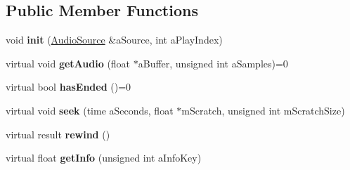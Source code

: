 \subsection*{Public Member Functions}
\begin{DoxyCompactItemize}
\item 
\mbox{\label{class_so_loud_1_1_audio_source_instance_aeb5f60467d4cf4837e8dab58569b3ad2}} 
void {\bfseries init} (\mbox{\hyperlink{class_so_loud_1_1_audio_source}{Audio\+Source}} \&a\+Source, int a\+Play\+Index)
\item 
\mbox{\label{class_so_loud_1_1_audio_source_instance_ab68c5c1b04f75af133740af9121c14d9}} 
virtual void {\bfseries get\+Audio} (float $\ast$a\+Buffer, unsigned int a\+Samples)=0
\item 
\mbox{\label{class_so_loud_1_1_audio_source_instance_a49b7277a667ff7b49c6e59941f2ee98c}} 
virtual bool {\bfseries has\+Ended} ()=0
\item 
\mbox{\label{class_so_loud_1_1_audio_source_instance_a1ff981495c00ddf75bb1a37d4282e25d}} 
virtual void {\bfseries seek} (time a\+Seconds, float $\ast$m\+Scratch, unsigned int m\+Scratch\+Size)
\item 
\mbox{\label{class_so_loud_1_1_audio_source_instance_a8eb4ca52148ecb9a12c64e4f6a30033f}} 
virtual result {\bfseries rewind} ()
\item 
\mbox{\label{class_so_loud_1_1_audio_source_instance_a67872273803ffaccb145da41a2f326cf}} 
virtual float {\bfseries get\+Info} (unsigned int a\+Info\+Key)
\end{DoxyCompactItemize}
